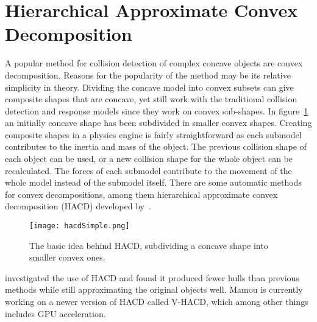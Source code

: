 \section{Hierarchical Approximate Convex Decomposition}
A popular method for collision detection of complex concave objects
are convex decomposition. Reasons for the popularity of the method may be its relative
simplicity in theory. Dividing the concave model into convex subsets
can give composite shapes that are concave, yet still work with the
traditional collision detection and response models since they work on convex
sub-shapes. In figure~\ref{fig:hacdSimple} an initially concave shape has
been subdivided in smaller convex shapes. Creating composite shapes in a physics
engine is fairly straightforward as each submodel contributes to the inertia and
mass of the object. The previous collision shape of each object can be used, or a new collision
shape for the whole object can be recalculated. The forces of each submodel
contribute to the movement of the whole model instead of the submodel itself.
There are some automatic methods for convex decompositions, among them hierarchical
 approximate convex decomposition (HACD) developed by~\cite{mamou}.

\begin{figure}[H]
  \centering
  \texttt{[image: hacdSimple.png]}
  \caption{The basic idea behind HACD, subdividing a concave shape into smaller convex ones.}
  \label{fig:hacdSimple}
\end{figure}

\cite{HACD} investigated the use of HACD and found it produced fewer hulls
than previous methods while still approximating the original objects well.
Mamou is currently working on a newer version of HACD called
V-HACD, which among other things includes GPU acceleration.
